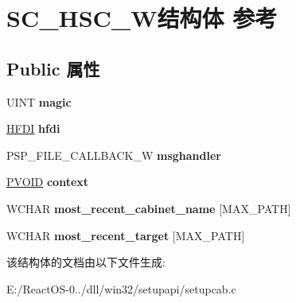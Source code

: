 \hypertarget{struct_s_c___h_s_c___w}{}\section{S\+C\+\_\+\+H\+S\+C\+\_\+\+W结构体 参考}
\label{struct_s_c___h_s_c___w}
\subsection*{Public 属性}
\begin{DoxyCompactItemize}
\item 
\mbox{\label{struct_s_c___h_s_c___w_aebd68e6e7ee17470b10ce554f1323da8}} 
U\+I\+NT {\bfseries magic}
\item 
\mbox{\label{struct_s_c___h_s_c___w_ae7c480d89ad6cdfe89ddaa4877bf7f81}} 
\hyperlink{interfacevoid}{H\+F\+DI} {\bfseries hfdi}
\item 
\mbox{\label{struct_s_c___h_s_c___w_a61c2683d2464066514bc8b0fb504f1ad}} 
P\+S\+P\+\_\+\+F\+I\+L\+E\+\_\+\+C\+A\+L\+L\+B\+A\+C\+K\+\_\+W {\bfseries msghandler}
\item 
\mbox{\label{struct_s_c___h_s_c___w_a9cedc29621b40ada88802ef18b58af4b}} 
\hyperlink{interfacevoid}{P\+V\+O\+ID} {\bfseries context}
\item 
\mbox{\label{struct_s_c___h_s_c___w_a9838c8383d6411e410433c4614ecc258}} 
W\+C\+H\+AR {\bfseries most\+\_\+recent\+\_\+cabinet\+\_\+name} \mbox{[}M\+A\+X\+\_\+\+P\+A\+TH\mbox{]}
\item 
\mbox{\label{struct_s_c___h_s_c___w_aeb8f2741a6e16dfeb30e609d978c9c6f}} 
W\+C\+H\+AR {\bfseries most\+\_\+recent\+\_\+target} \mbox{[}M\+A\+X\+\_\+\+P\+A\+TH\mbox{]}
\end{DoxyCompactItemize}


该结构体的文档由以下文件生成\+:\begin{DoxyCompactItemize}
\item 
E\+:/\+React\+O\+S-\/0../dll/win32/setupapi/setupcab.\+c\end{DoxyCompactItemize}
